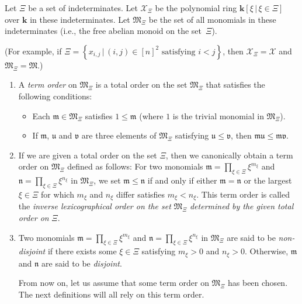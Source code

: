 \documentclass[pdftex]{sigma}
\numberwithin{equation}{section}
\let\prodnonlimits\prod
\renewcommand{\prod}{\prodnonlimits\limits}
\begin{document}
\begin{Definition}\label{def.groebner.all}Let $\Xi$ be a set of indeterminates. Let $\mathcal{X}_{\Xi}$ be the polynomial ring $\mathbf{k}\left[ \xi\,|\, \xi\in\Xi\right] $ over $\mathbf{k}$ in these indeterminates. Let $\mathfrak{M}_{\Xi}$ be the set of all monomials in these indeterminates (i.e., the free abelian monoid on the set~$\Xi$).

(For example, if $\Xi=\left\{ x_{i,j}\,|\, (i,j) \in[n]^{2}\text{ satisfying }i<j\right\} $, then $\mathcal{X}_{\Xi}=\mathcal{X}$ and $\mathfrak{M}_{\Xi}=\mathfrak{M}$.)
\begin{enumerate}\itemsep=0pt
\item[(a)] A \textit{term order} on $\mathfrak{M}_{\Xi}$ is a total order on the set $\mathfrak{M}_{\Xi}$ that satisfies the following conditions:
\begin{itemize}\itemsep=0pt
\item Each $\mathfrak{m}\in\mathfrak{M}_{\Xi}$ satisfies $1\leq\mathfrak{m}$ (where $1$ is the trivial monomial in $\mathfrak{M}_{\Xi}$).
\item If $\mathfrak{m}$, $\mathfrak{u}$ and $\mathfrak{v}$ are three elements of $\mathfrak{M}_{\Xi}$ satisfying $\mathfrak{u}\leq\mathfrak{v}$, then $\mathfrak{mu}\leq\mathfrak{mv}$.
\end{itemize}
\item[(b)] If we are given a total order on the set $\Xi$, then we canonically obtain a term order on $\mathfrak{M}_{\Xi}$ defined as follows: For two monomials $\mathfrak{m}=\prod_{\xi\in\Xi}\xi^{m_{\xi}}$ and
$\mathfrak{n}=\prod_{\xi\in\Xi}\xi^{n_{\xi}}$ in $\mathfrak{M}_{\Xi}$, we set $\mathfrak{m}\leq\mathfrak{n}$ if and only if either $\mathfrak{m}=\mathfrak{n}$ or the largest $\xi\in\Xi$ for which $m_{\xi}$ and $n_{\xi}$
differ satisfies $m_{\xi}<n_{\xi}$. This term order is called the \textit{inverse lexicographical order on the set} $\mathfrak{M}_{\Xi}$ \textit{determined by the given total order on }$\Xi$.

\item[(c)] Two monomials $\mathfrak{m}=\prod_{\xi\in\Xi}\xi^{m_{\xi}}$ and $\mathfrak{n}=\prod_{\xi\in\Xi}\xi^{n_{\xi}}$ in $\mathfrak{M}_{\Xi}$ are said to be \textit{non-disjoint} if there exists some $\xi\in\Xi$ satisfying $m_{\xi}>0$ and $n_{\xi}>0$. Otherwise, $\mathfrak{m}$ and $\mathfrak{n}$ are said to be \textit{disjoint}.

From now on, let us assume that some term order on $\mathfrak{M}_{\Xi}$ has been chosen. The next definitions will all rely on this term order.


\end{enumerate}
\end{Definition}
\end{document}
